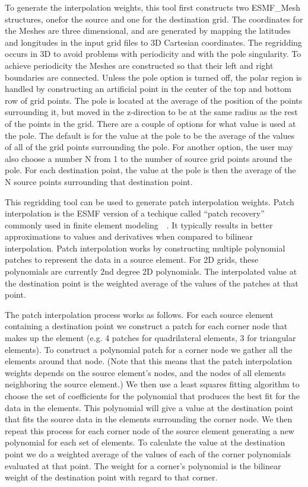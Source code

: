  To generate the interpolation weights, this tool first constructs two ESMF\_Mesh 
structures, onefor the source and one for the destination grid. 
The coordinates for the Meshes are three dimensional, and are generated by mapping 
the latitudes and longitudes in the input grid files to 
3D Cartesian coordinates. The regridding occurs in 3D to avoid
problems with periodicity and with the pole singularity. To achieve periodicity 
the Meshes are constructed so that their left and right boundaries are connected. 
Unless the pole option is turned off, the polar region is handled by constructing 
an artificial point in the center of the top and bottom row of grid points. 
The pole is located at the average of the position of the points surrounding
it, but moved in the z-direction to be at the same radius as the rest of the points
in the grid. There are a couple of options for what value is used at the pole. 
The default is for the value at the pole to be the average of the values
of all of the grid points surrounding the pole. For another option, the user may also choose
a number N from 1 to the number of source grid points around the pole. For
each destination point, the value at the pole is then the average of the N source points
surrounding that destination point.

  This regridding tool can be used to generate patch interpolation weights. Patch
interpolation is the ESMF version of a techique called ``patch recovery'' commonly
used in finite element modeling~\cite{PatchInterp1}~\cite{PatchInterp2}. It typically results in better approximations to values and derivatives when compared to bilinear interpolation.  
Patch interpolation works by constructing multiple polynomial patches to represent
the data in a source element. For 2D grids, these polynomials 
are currently 2nd degree 2D polynomials. The interpolated value at the destination point 
is the weighted average of the values of the patches at that point. 

The patch interpolation process works as follows. 
For each source element containing a destination point
we construct a patch for each corner node that makes up the element (e.g. 4 patches for 
quadrilateral elements, 3 for triangular elements). To construct a polynomial patch for
 a corner node we gather all the elements around that node. 
(Note that this means that the patch interpolation weights depends on the source 
element's nodes, and the nodes of all elements neighboring the source element.)  
We then use a least squares fitting algorithm to choose the set of coefficients 
for the polynomial that produces the best fit for the data in the elements. 
This polynomial will give a value at the destination point that fits the source data 
in the elements surrounding the corner node. We then repeat this process for each 
corner node of the source element generating a new polynomial for each set of elements.  
To calculate the value at the destination point we do a weighted average of the values 
of each of the corner polynomials evaluated at that point. The weight for a corner's 
polynomial is the bilinear weight of the destination point with regard to that corner.  

